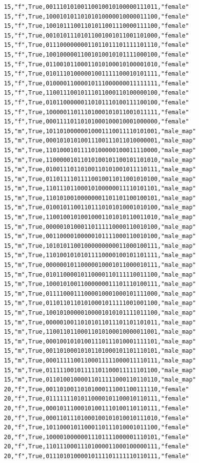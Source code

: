 \documentclass[authoryearcitations]{UoYCSproject}
\begin{document}
\begin{framed}
\begin{verbatim}
15,"f",True,00111010100110010010100000111011,"female"
15,"f",True,10001010110101010000010000011100,"female"
15,"f",True,10010111001101011001110000111100,"female"
15,"f",True,00101011101011001001011001101000,"female"
15,"f",True,01110000000011011011101111101110,"female"
15,"f",True,10010000011001010010101111000100,"female"
15,"f",True,01100101100011010100010100001010,"female"
15,"f",True,01011101000001001111100010101111,"female"
15,"f",True,01000011000010111000000011111111,"female"
15,"f",True,11001110010111011000110100000100,"female"
15,"f",True,01011000000110101110100111100100,"female"
15,"f",True,10000011011101000101011001011111,"female"
15,"f",True,00011110110101000100010001000000,"female"
15,"m",True,10110100000010001110011110101001,"male_map"
15,"m",True,00010101010011100111011010000001,"male_map"
15,"m",True,11010001011110100000100011110000,"male_map"
15,"m",True,11000001011010100101100101101010,"male_map"
15,"m",True,01001110110100110101001011110111,"male_map"
15,"m",True,01101111011110010011011001010100,"male_map"
15,"m",True,11011101100010100000011110101101,"male_map"
15,"m",True,11010100100000001101101100100101,"male_map"
15,"m",True,01001011001101110101010001010100,"male_map"
15,"m",True,11001001010010001101010110011010,"male_map"
15,"m",True,00000101000110111110000110010100,"male_map"
15,"m",True,00110000100000101111000110010100,"male_map"
15,"m",True,10101011001000000000011000100111,"male_map"
15,"m",True,11010010101011110000100101101111,"male_map"
15,"m",True,00000010110000010001011000010111,"male_map"
15,"m",True,01011000010110000110111110011100,"male_map"
15,"m",True,10001010011000000011101110100111,"male_map"
15,"m",True,01111000111000010001000101111000,"male_map"
15,"m",True,01101101101010001011111001001100,"male_map"
15,"m",True,10010100000100001010101111011100,"male_map"
15,"m",True,00000100110101011011101101101011,"male_map"
15,"m",True,11001101100011010100010000011001,"male_map"
15,"m",True,00010010101001110111010001111101,"male_map"
15,"m",True,00110100010101101000101101110101,"male_map"
15,"m",True,00011111001100011111000011110111,"male_map"
15,"m",True,01111100101111101100011111101100,"male_map"
15,"m",True,01101001000011011111000110110110,"male_map"
20,"f",True,00110100110101000111001100111110,"female"
20,"f",True,01111111010110000101100010110111,"female"
20,"f",True,00010111000101001110100110110111,"female"
20,"f",True,00011011101000100101010010111010,"female"
20,"f",True,10110001011000110111010001011100,"female"
20,"f",True,10000100000011101111000001110101,"female"
20,"f",True,11011100011101000011000100000111,"female"
20,"f",True,01110101000010111101111110110111,"female"

\end{verbatim}
\end{framed}
\end{document}
